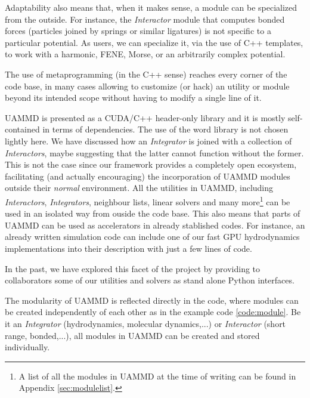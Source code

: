 \documentclass[ twoside,openright,titlepage,numbers=noenddot,%
headinclude,footinclude,cleardoublepage=empty,abstract=on,
BCOR=5mm,paper=a4,fontsize=11pt, dvipsnames
]{scrreprt}
\newcommand{\uammd}{\gls{UAMMD}\xspace}
\newcommand{\gpu}{\gls{GPU}\xspace}
\begin{document}
Adaptability also means that, when it makes sense, a module can be specialized from the outside. For instance, the \emph{Interactor} module that computes bonded forces (particles joined by springs or similar ligatures) is not specific to a particular potential. As users, we can specialize it, via the use of C++ templates, to work with a harmonic\cite{harmonic}, FENE\cite{fene}, Morse\cite{morse}, or an arbitrarily complex potential.

The use of metaprogramming (in the C++ sense) reaches every corner of the code base, in many cases allowing to customize (or hack) an utility or module beyond its intended scope without having to modify a single line of it.

\uammd is presented as a CUDA/C++ header-only library and it is mostly self-contained in terms of dependencies. The use of the word library is not chosen lightly here. We have discussed how an \emph{Integrator} is joined with a collection of \emph{Interactors}, maybe suggesting that the latter cannot function without the former. This is not the case since our framework provides a completely open ecosystem, facilitating (and actually encouraging) the incorporation of \uammd modules outside their \emph{normal} environment.
All the utilities in \uammd, including \emph{Interactors}, \emph{Integrators}, neighbour lists, linear solvers and many more\footnote{A list of all the modules in \uammd at the time of writing can be found in Appendix \ref{sec:modulelist}.} can be used in an isolated way from ouside the code base. This also means that parts of \uammd can be used as accelerators in already stablished codes. For instance, an already written simulation code can include one of our fast \gpu hydrodynamics implementations into their description with just a few lines of code.

In the past, we have explored this facet of the project by providing to collaborators some of our utilities and solvers as stand alone Python interfaces.

The modularity of \uammd is reflected directly in the code, where modules can be created independently of each other as in the example code \ref{code:module}.
Be it an \emph{Integrator} (hydrodynamics, molecular dynamics,...) or \emph{Interactor} (short range, bonded,...), all modules in \uammd can be created and stored individually.
\end{document}

